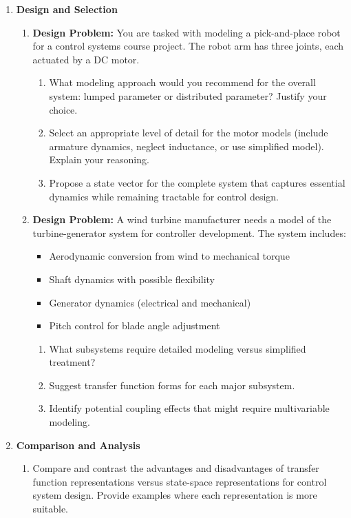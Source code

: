 \begin{enumerate}
\begin{enumerate}
\end{enumerate}

\item \textbf{Design and Selection}
\begin{enumerate}
\item \textbf{Design Problem:} You are tasked with modeling a pick-and-place robot for a control systems course project. The robot arm has three joints, each actuated by a DC motor.
\begin{enumerate}
\item What modeling approach would you recommend for the overall system: lumped parameter or distributed parameter? Justify your choice.
\item Select an appropriate level of detail for the motor models (include armature dynamics, neglect inductance, or use simplified model). Explain your reasoning.
\item Propose a state vector for the complete system that captures essential dynamics while remaining tractable for control design.
\end{enumerate}

\item \textbf{Design Problem:} A wind turbine manufacturer needs a model of the turbine-generator system for controller development. The system includes:
\begin{itemize}
\item Aerodynamic conversion from wind to mechanical torque
\item Shaft dynamics with possible flexibility
\item Generator dynamics (electrical and mechanical)
\item Pitch control for blade angle adjustment
\end{itemize}
\begin{enumerate}
\item What subsystems require detailed modeling versus simplified treatment?
\item Suggest transfer function forms for each major subsystem.
\item Identify potential coupling effects that might require multivariable modeling.

\end{enumerate}

\end{enumerate}

\item \textbf{Comparison and Analysis}
\begin{enumerate}
\item Compare and contrast the advantages and disadvantages of transfer function representations versus state-space representations for control system design. Provide examples where each representation is more suitable.


\end{enumerate}
\end{enumerate}
